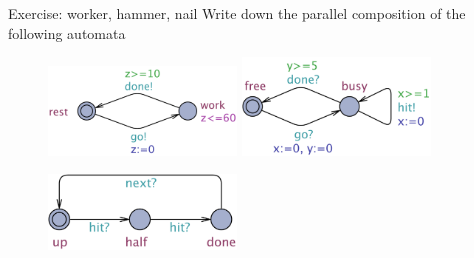 \documentclass{beamer}
\begin{document}
\begin{slide}{Exercise: worker, hammer, nail}
        Write down the parallel composition of the following automata

\begin{figure}[htb]
  \includegraphics[width=50mm]{./images/Worker.pdf}
  \hspace{0.5cm}
  \includegraphics[width=50mm]{./images/Hammer.pdf}

  \vspace{0.5cm}
  \includegraphics[width=50mm]{./images/Nail.pdf}
\end{figure}
\end{slide}
\end{document}
